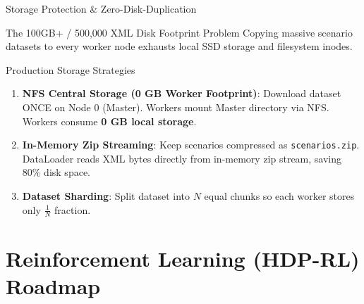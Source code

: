 \documentclass[t]{beamer}
\begin{document}
\begin{frame}{Storage Protection \& Zero-Disk-Duplication}
    \begin{alertblock}{The 100GB+ / 500,000 XML Disk Footprint Problem}
        Copying massive scenario datasets to every worker node exhausts local SSD storage and filesystem inodes.
    \end{alertblock}

    \begin{block}{Production Storage Strategies}
        \begin{enumerate}
            \item \textbf{NFS Central Storage (0 GB Worker Footprint)}:
              Download dataset ONCE on Node 0 (Master). Workers mount Master directory via NFS. Workers consume \textbf{0 GB local storage}.
            \item \textbf{In-Memory Zip Streaming}:
              Keep scenarios compressed as \texttt{scenarios.zip}. DataLoader reads XML bytes directly from in-memory zip stream, saving 80\% disk space.
            \item \textbf{Dataset Sharding}:
              Split dataset into $N$ equal chunks so each worker stores only $\frac{1}{N}$ fraction.
        \end{enumerate}
    \end{block}
\end{frame}

\section{Reinforcement Learning (HDP-RL) Roadmap}
\end{document}
